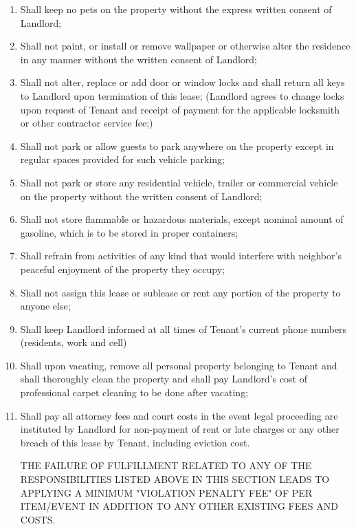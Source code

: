\documentclass[9pt]{article}
\begin{document}
\begin{enumerate}[label=\roman*)]
		In addition, it is understood, acknowledged and agreed that Tenant:
		\item Shall keep no pets on the property without the express written consent of Landlord;
		\item Shall not paint, or install or remove wallpaper or otherwise alter the residence in any manner without the written consent of Landlord;
		\item Shall not alter, replace or add door or window locks and shall return all keys to Landlord upon termination of this lease; (Landlord agrees to change locks upon request of Tenant and receipt of payment for the applicable locksmith or other contractor service fee;)
		\item Shall not park or allow guests to park anywhere on the property except in regular spaces provided for such vehicle parking;
		\item Shall not park or store any residential vehicle, trailer or commercial vehicle on the property without the written consent of Landlord;
		\item Shall not store flammable or hazardous materials, except nominal amount of gasoline, which is to be stored in proper containers;
		\item Shall refrain from activities of any kind that would interfere with neighbor's peaceful enjoyment of the property they occupy;
		\item Shall not assign this lease or sublease or rent any portion of the property to anyone else;
		\item Shall keep Landlord informed at all times of Tenant's current phone numbers (residents, work and cell)
		\item Shall upon vacating, remove all personal property belonging to Tenant and shall thoroughly clean the property and shall pay Landlord's cost of professional carpet cleaning to be done after vacating;
		\item Shall pay all attorney fees and court costs in the event legal proceeding are instituted by Landlord for non-payment of rent or late charges or any other breach of this lease by Tenant, including eviction cost.
		
		THE FAILURE OF FULFILLMENT RELATED TO ANY OF THE RESPONSIBILITIES LISTED ABOVE IN THIS SECTION LEADS TO APPLYING A MINIMUM "VIOLATION PENALTY FEE" OF \SmallBox{\$\PenaltyFine} PER ITEM/EVENT IN ADDITION TO ANY OTHER EXISTING FEES AND COSTS.
		
	\end{enumerate}
	
\end{document}
